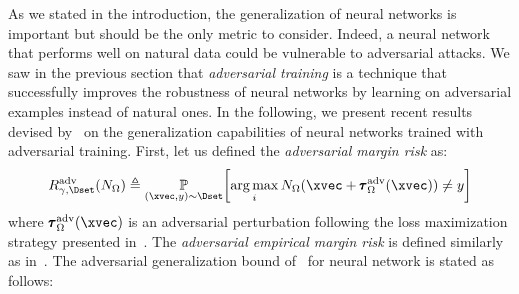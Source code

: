 As we stated in the introduction, the generalization of neural networks is important but should be the only metric to consider.
Indeed, a neural network that performs well on natural data could be vulnerable to adversarial attacks.
We saw in the previous section that \emph{adversarial training} is a technique that successfully improves the robustness of neural networks by learning on adversarial examples instead of natural ones.
In the following, we present recent results devised by~\citet{farnia2018generalizable} on the generalization capabilities of neural networks trained with adversarial training.
First, let us defined the \emph{adversarial margin risk} as:
\begin{equation}
  R_{\gamma, \Dset}^{\text{adv}}(N_\Omega) \triangleq \Pbb_{(\xvec, y) \sim \Dset} \left[\argmax_i N_\Omega(\xvec + \adv^{\text{adv}}_\Omega(\xvec) ) \neq y \right] 
\end{equation}
where $\adv^{\text{adv}}_\Omega(\xvec)$ is an adversarial perturbation following the loss maximization strategy presented in~.
The \emph{adversarial empirical margin risk} is defined similarly as in~.
The adversarial generalization bound of~\citet{farnia2018generalizable} for neural network is stated as follows:
